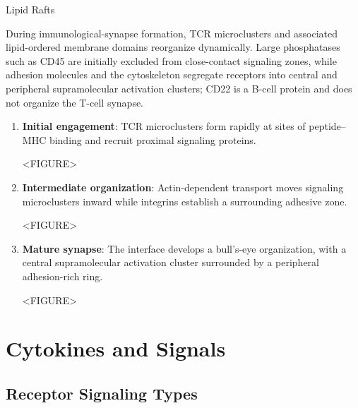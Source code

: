     \begin{core}{Lipid Rafts}

      During immunological-synapse formation, TCR microclusters and associated lipid-ordered membrane domains reorganize dynamically. Large phosphatases such as CD45 are initially excluded from close-contact signaling zones, while adhesion molecules and the cytoskeleton segregate receptors into central and peripheral supramolecular activation clusters; CD22 is a B-cell protein and does not organize the T-cell synapse.

      \begin{enumerate}[label=(\arabic*)]

        \item \textbf{Initial engagement}: TCR microclusters form rapidly at sites of peptide--MHC binding and recruit proximal signaling proteins.

          <FIGURE>

        \item \textbf{Intermediate organization}: Actin-dependent transport moves signaling microclusters inward while integrins establish a surrounding adhesive zone.

          <FIGURE>

        \item \textbf{Mature synapse}: The interface develops a bull's-eye organization, with a central supramolecular activation cluster surrounded by a peripheral adhesion-rich ring.

          <FIGURE>

      \end{enumerate}

    \end{core}
  
\section{Cytokines and Signals}

  \subsection{Receptor Signaling Types}

